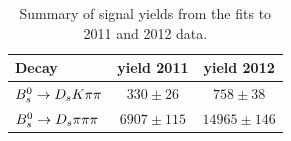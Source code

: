 \begin{table}[h]
\centering
\begin{tabular}{l c c}
Decay & yield 2011 & yield 2012\\
\hline
${{B}^0_{s}}\rightarrow{\ensuremath{{D}_{s}}}{\ensuremath{K}}{\ensuremath{\pi}}{\ensuremath{\pi}}$ &  $330 \pm  26$   &  $758 \pm 38$\\
${{B}^0_{s}}\rightarrow{\ensuremath{{D}_{s}}}{\ensuremath{\pi}}{\ensuremath{\pi}}{\ensuremath{\pi}}$ &  $6907 \pm 115$  &  $14965 \pm 146$\\
\hline
\end{tabular}
\caption{Summary of signal yields from the fits to 2011 and 2012 data.}
\label{tab: SigYields}
\end{table}

